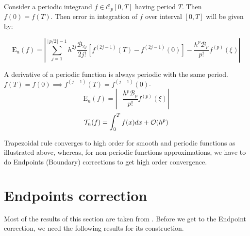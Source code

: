 \documentclass[../document.tex]{subfiles}
\begin{document}
	\begin{lemma}
		Consider a periodic integrand $f \in \mathcal{C}_p[0,T]$ having period $T$. Then $f(0) = f(T)$. Then error in integration of $f$ over interval $[0,T]$ will be given by:
		
		$$
		\mathrm{E}_n(f)
		= \left| \sum_{j=1}^{ \lfloor p/2\rfloor -1 }  h^{2j} \frac{\mathcal{B}_{2j}}{2j!}
		\left[
		f^{(2j-1)}(T) - f^{(2j-1)}(0) 
		\right] -  \frac{h^p  \mathcal{B}_p  }{p!}  f^{ (p)} (\xi) \right|
		$$
		
		A derivative of a periodic function is always periodic with the same period.
		$f(T) = f(0) \implies f^{(j-1)}(T) = f^{(j-1)}(0)$.
		$$
		\mathrm{E}_n(f) = \left| - \frac{h^p  \mathcal{B}_p  }{p!}  f^{ (p)} (\xi)\right| 
		$$
		$$
		\mathcal{T}_n(f) = \int_0^T f(x)dx +  \mathcal{O}(h^p)
		$$
		
		
		
	\end{lemma}
	Trapezoidal rule converges to high order for smooth and periodic functions as illustrated above, whereas, for non-periodic functions approximations, we have to do Endpoints (Boundary) corrections to get high order convergence.
	
	
	
	
	\section{Endpoints correction}  \label{Endpoints_correction}
	
	Most of the results of this section are taken from \cite{kapur1997high, rokhlin1990end}.
	Before we get to the Endpoint correction, we need the following results for its construction. 
	
\end{document}

